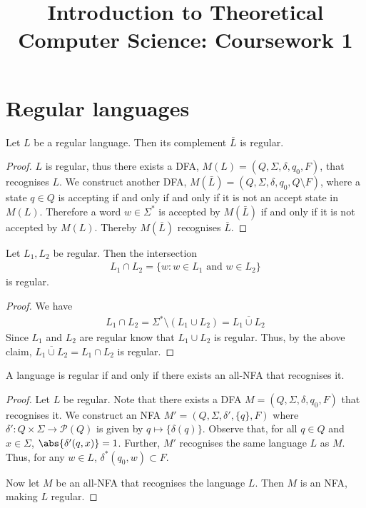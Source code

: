 \documentclass{article}
\title{Introduction to Theoretical Computer Science: Coursework 1}
\begin{document}
\section{Regular languages}

\begin{claim}
	Let $L$ be a regular language. Then its complement $\bar L$ is regular.
\end{claim}
\begin{proof}
	$L$ is regular, thus there exists a DFA, $M(L)=(Q,\Sigma,\delta,q_0,F)$,
	that recognises $L$. We construct another DFA,
	$M(\bar L)=(Q,\Sigma,\delta,q_0,Q\setminus F)$, where a state $q\in Q$ is
	accepting if and only if and only if it is not an accept state in
	$M(L)$. Therefore a word $w\in\Sigma^*$ is accepted by $M(\bar L)$
	if and only if it is not accepted by $M(L)$. Thereby $M(\bar L)$
	recognises $\bar L$.
\end{proof}

\begin{claim}
	Let $L_1,L_2$ be regular. Then the intersection
	\begin{align*}
		L_1\cap L_2 = \{w : w \in L_1 \text{ and } w \in L_2\}
	\end{align*}
	is regular.
\end{claim}
\begin{proof}
	We have
	\begin{align*}
		L_1 \cap L_2 = \Sigma^*\setminus (L_1\cup L_2) = \overline{L_1\cup L_2}
	\end{align*}
	Since $L_1$ and $L_2$ are regular know that $L_1\cup L_2$ is regular.
	Thus, by the above claim, $\overline{L_1\cup L_2}=L_1\cap L_2$ is regular.
\end{proof}

\begin{claim}
	A language is regular if and only if there exists an all-NFA that recognises it.
\end{claim}
\begin{proof}
	Let $L$ be regular. Note that there exists a DFA $M=(Q,\Sigma,\delta,q_0,F)$
	that recognises it. We construct an NFA $M'=(Q,\Sigma,\delta',\{q\},F)$
	where $\delta':Q\times\Sigma \to \mathcal{P}(Q)$ is given by $q \mapsto \{\delta(q)\}$.
	Observe that, for all $q\in Q$ and $x\in\Sigma$, $\abs{\delta'(q,x)}=1$.
	Further, $M'$ recognises the same language $L$ as $M$.
	Thus, for any $w\in L$, $\delta^*(q_0,w)\subset F$.

	Now let $M$ be an all-NFA that recognises the language $L$. Then $M$ is an
	NFA, making $L$ regular.
\end{proof}
\end{document}
